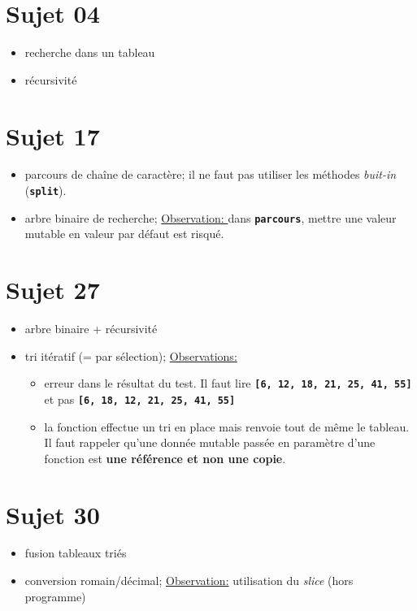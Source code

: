 \documentclass[a4paper,11pt]{article}
\begin{document}
\section{Sujet 04}
\begin{itemize}
    \item recherche dans un tableau
    \item récursivité
\end{itemize}
\section{Sujet 17}
\begin{itemize}
    \item parcours de chaîne de caractère; il ne faut pas utiliser les méthodes \emph{buit-in} (\textbf{\texttt{split}}).
    \item arbre binaire de recherche; \underline{Observation: } dans \textbf{\texttt{parcours}}, mettre une valeur mutable en valeur par défaut est risqué.
\end{itemize}
\section{Sujet 27}
\begin{itemize}
    \item arbre binaire + récursivité
    \item tri itératif (= par sélection); \underline{Observations:} \begin{itemize}
              \item erreur dans le résultat du test. Il faut lire \textbf{\texttt{[6, 12, 18, 21, 25, 41, 55]}} et pas \textbf{\texttt{[6, 18, 12, 21, 25, 41, 55]}}
              \item la fonction effectue un tri en place mais renvoie tout de même le tableau. Il faut rappeler qu'une donnée mutable passée en paramètre d'une fonction est \textbf{une référence et non une copie}.
          \end{itemize}
\end{itemize}
\section{Sujet 30}
\begin{itemize}
    \item fusion tableaux triés
    \item conversion romain/décimal; \underline{Observation:} utilisation du \emph{slice} (hors programme)
\end{itemize}
\end{document}
